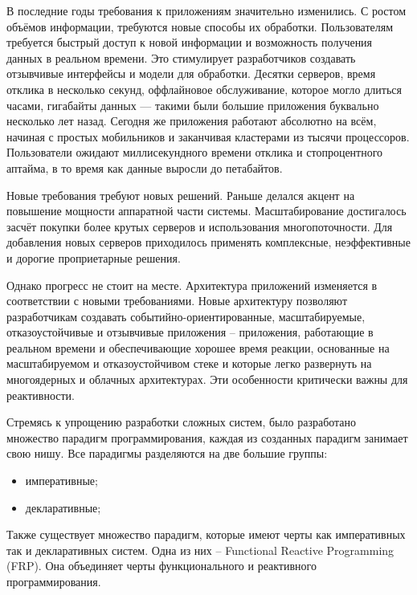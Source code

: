 \label{sec:intro}

В последние годы требования к приложениям значительно изменились. С ростом объёмов информации, требуются новые способы их обработки. Пользователям требуется быстрый доступ к новой информации и возможность получения данных в реальном времени. Это стимулирует разработчиков создавать отзывчивые интерфейсы и модели для обработки. Десятки серверов, время отклика в несколько секунд, оффлайновое обслуживание, которое могло длиться часами, гигабайты данных — такими были большие приложения буквально несколько лет назад. Сегодня же приложения работают абсолютно на всём, начиная с простых мобильников и заканчивая кластерами из тысячи процессоров. Пользователи ожидают миллисекундного времени отклика и стопроцентного аптайма, в то время как данные выросли до петабайтов.

Новые требования требуют новых решений. Раньше делался акцент на повышение мощности аппаратной части системы. Масштабирование достигалось засчёт покупки более крутых серверов и использования многопоточности. Для добавления новых серверов приходилось применять комплексные, неэффективные и дорогие проприетарные решения.

Однако прогресс не стоит на месте. Архитектура приложений изменяется в соответствии с новыми требованиями. Новые архитектуру позволяют разработчикам создавать событийно-ориентированные, масштабируемые, отказоустойчивые и отзывчивые приложения -- приложения, работающие в реальном времени и обеспечивающие хорошее время реакции, основанные на масштабируемом и отказоустойчивом стеке и которые легко развернуть на многоядерных и облачных архитектурах. Эти особенности критически важны для реактивности.

Стремясь к упрощению разработки сложных систем, было разработано множество парадигм программирования, каждая из созданных парадигм занимает свою нишу. Все парадигмы разделяются на две большие группы:

\begin{itemize}
  \item императивные;
  \item декларативные;
\end{itemize}

Также существует множество парадигм, которые имеют черты как императивных так и декларативных систем. Одна из них -- Functional Reactive Programming (FRP). Она объединяет черты функционального и реактивного программирования.

